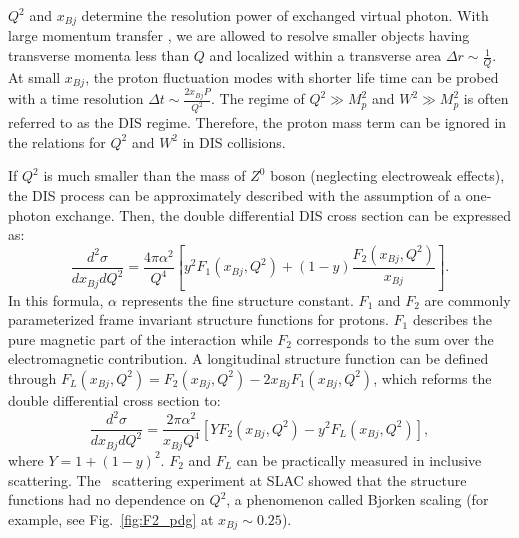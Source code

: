 $Q^{2}$ and $x_{Bj}$ determine the resolution power of exchanged virtual photon. With large momentum transfer \qsq, we are allowed to resolve smaller objects
having transverse momenta less than $Q$ and localized within a transverse
area $\Delta r\sim \frac{1}{Q}$. At small $x_{Bj}$, the proton fluctuation modes with shorter life time can be probed with a time resolution  $\Delta t\sim \frac{2x_{Bj}P}{Q^{2}}$.
The regime of $Q^{2}\gg M^{2}_{p}$ and $W^{2}\gg M^{2}_{p}$ is often referred
to as the DIS regime. Therefore, the proton mass term can be ignored in the relations
for $Q^{2}$ and $W^{2}$ in DIS collisions.

If $Q^{2}$ is much smaller than the mass of $Z^{0}$ boson (neglecting electroweak effects), the DIS process
can be approximately described with the assumption of a one-photon exchange. Then,
the double differential DIS cross section can be expressed as:
\begin{equation}
\frac{d^{2}\sigma}{dx_{Bj}dQ^{2}}=\frac{4\pi\alpha^{2}}{Q^{4}}[y^{2}F_{1}(x_{Bj},Q^{2})+(1-y)\frac{F_{2}(x_{Bj},Q^{2})}{x_{Bj}}].
\end{equation}
In this formula, $\alpha$ represents the fine structure constant. $F_{1}$ and
$F_{2}$ are commonly parameterized frame invariant structure functions for
protons. $F_{1}$ describes the pure magnetic part of the interaction while $F_{2}$
corresponds to the sum over the electromagnetic contribution. A longitudinal structure function can
be defined through $F_{L}(x_{Bj},Q^{2})=F_{2}(x_{Bj},Q^{2})-2x_{Bj}F_{1}(x_{Bj},Q^{2})$,
which reforms the double differential cross section to:
\begin{equation}
\frac{d^{2}\sigma}{dx_{Bj}dQ^{2}}=\frac{2\pi\alpha^{2}}{x_{Bj}Q^{4}}[YF_{2}(x_{Bj},Q^{2})-y^{2}F_{L}(x_{Bj},Q^{2})],
\end{equation}
where $Y=1+(1-y)^{2}$. $F_{2}$ and $F_{L}$ can be practically measured in
inclusive scattering. The \ep\ scattering experiment at SLAC showed that the
structure functions had no dependence on $Q^{2}$, a phenomenon called Bjorken scaling 
(for example, see Fig.~\ref{fig:F2_pdg} at $x_{Bj}\sim0.25$).

